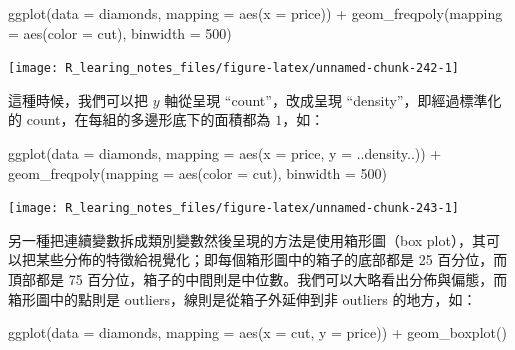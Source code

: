\documentclass[
]{book}
\newenvironment{Shaded}{\begin{snugshade}}{\end{snugshade}}
\newcommand{\AttributeTok}[1]{\textcolor[rgb]{0.77,0.63,0.00}{#1}}
\newcommand{\DecValTok}[1]{\textcolor[rgb]{0.00,0.00,0.81}{#1}}
\newcommand{\FunctionTok}[1]{\textcolor[rgb]{0.00,0.00,0.00}{#1}}
\newcommand{\NormalTok}[1]{#1}
\newcommand{\SpecialCharTok}[1]{\textcolor[rgb]{0.00,0.00,0.00}{#1}}
\theoremstyle{definition}
\theoremstyle{remark}
\begin{document}
\begin{Shaded}
\begin{Highlighting}[]
\FunctionTok{ggplot}\NormalTok{(}\AttributeTok{data =}\NormalTok{ diamonds, }\AttributeTok{mapping =} \FunctionTok{aes}\NormalTok{(}\AttributeTok{x =}\NormalTok{ price)) }\SpecialCharTok{+}
  \FunctionTok{geom\_freqpoly}\NormalTok{(}\AttributeTok{mapping =} \FunctionTok{aes}\NormalTok{(}\AttributeTok{color =}\NormalTok{ cut), }\AttributeTok{binwidth =} \DecValTok{500}\NormalTok{)}
\end{Highlighting}
\end{Shaded}

\begin{center}\texttt{[image: R\_learing\_notes\_files/figure-latex/unnamed-chunk-242-1]} \end{center}

這種時候，我們可以把 \(y\) 軸從呈現 ``count''，改成呈現 ``density''，即經過標準化的 count，在每組的多邊形底下的面積都為 \(1\)，如：

\begin{Shaded}
\begin{Highlighting}[]
\FunctionTok{ggplot}\NormalTok{(}\AttributeTok{data =}\NormalTok{ diamonds, }\AttributeTok{mapping =} \FunctionTok{aes}\NormalTok{(}\AttributeTok{x =}\NormalTok{ price, }\AttributeTok{y =}\NormalTok{ ..density..)) }\SpecialCharTok{+}
  \FunctionTok{geom\_freqpoly}\NormalTok{(}\AttributeTok{mapping =} \FunctionTok{aes}\NormalTok{(}\AttributeTok{color =}\NormalTok{ cut), }\AttributeTok{binwidth =} \DecValTok{500}\NormalTok{)}
\end{Highlighting}
\end{Shaded}

\begin{center}\texttt{[image: R\_learing\_notes\_files/figure-latex/unnamed-chunk-243-1]} \end{center}

另一種把連續變數拆成類別變數然後呈現的方法是使用箱形圖（box plot），其可以把某些分佈的特徵給視覺化；即每個箱形圖中的箱子的底部都是 25 百分位，而頂部都是 75 百分位，箱子的中間則是中位數。我們可以大略看出分佈與偏態，而箱形圖中的點則是 outliers，線則是從箱子外延伸到非 outliers 的地方，如：

\begin{Shaded}
\begin{Highlighting}[]
\FunctionTok{ggplot}\NormalTok{(}\AttributeTok{data =}\NormalTok{ diamonds, }\AttributeTok{mapping =} \FunctionTok{aes}\NormalTok{(}\AttributeTok{x =}\NormalTok{ cut, }\AttributeTok{y =}\NormalTok{ price)) }\SpecialCharTok{+}
  \FunctionTok{geom\_boxplot}\NormalTok{()}
\end{Highlighting}
\end{Shaded}
\end{document}
